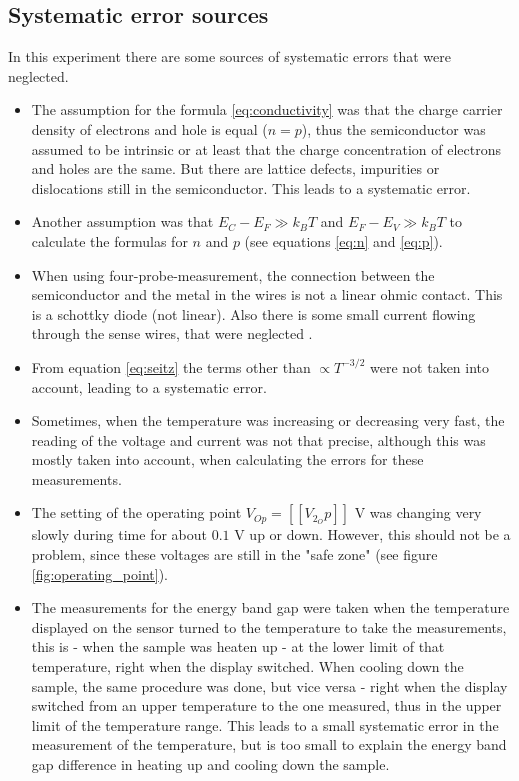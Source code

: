 \documentclass[a4paper]{article}
\begin{document}
\subsection{Systematic error sources}
\label{sec:systematic_errors}

In this experiment there are some sources of systematic errors that were neglected.

\begin{itemize}
\item The assumption for the formula \eqref{eq:conductivity} was that the charge carrier density of electrons and hole is equal ($n = p$), thus the semiconductor was assumed to be intrinsic or at least that the charge concentration of electrons and holes are the same. But there are lattice defects, impurities or  dislocations still in the semiconductor. This leads to a systematic error.
\item Another assumption was that $E_C - E_F \gg k_B T$ and $E_F - E_V \gg k_B T$ to calculate the formulas for $n$ and $p$ (see equations \eqref{eq:n} and \eqref{eq:p}).
\item When using four-probe-measurement, the connection between the semiconductor and the metal in the wires is not a linear ohmic contact. This is a schottky diode (not linear). Also there is some small current flowing through the sense wires, that were neglected \cite{llmh}.
\item From equation \eqref{eq:seitz} the terms other than $\propto T^{-3/2}$ were not taken into account, leading to a systematic error.
\item Sometimes, when the temperature was increasing or decreasing very fast, the reading of the voltage and current was not that precise, although this was mostly taken into account, when calculating the errors for these measurements.
\item The setting of the operating point $V_{Op} = [[V_2_Op]]$ V was changing very slowly during time for about $0.1$ V up or down. However, this should not be a problem, since these voltages are still in the "safe zone" (see figure \ref{fig:operating_point}).
\item The measurements for the energy band gap were taken when the temperature displayed on the sensor turned to the temperature to take the measurements, this is - when the sample was heaten up - at the lower limit of that temperature, right when the display switched. When cooling down the sample, the same procedure was done, but vice versa - right when the display switched from an upper temperature to the one measured, thus in the upper limit of the temperature range. This leads to a small systematic error in the measurement of the temperature, but is too small to explain the energy band gap difference in heating up and cooling down the sample.

\end{itemize}
\end{document}

